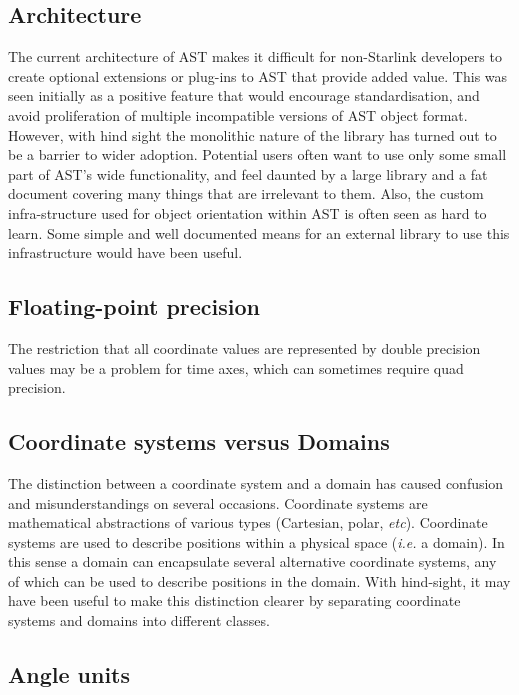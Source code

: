 \documentclass[final,authoryear,5p,times,twocolumn]{elsarticle}
\begin{document}
\subsection{Architecture}

The current architecture of AST makes it difficult for non-Starlink
developers to create optional extensions or plug-ins to AST that provide added
value. This was seen initially as a positive feature that would
encourage standardisation, and avoid proliferation of multiple incompatible
versions of AST object format. However, with hind sight the monolithic
nature of the library has turned out to be a barrier to wider adoption.
Potential users often want to use only some small part of AST's wide
functionality, and feel daunted by a large library and a fat document
covering many things that are irrelevant to them. Also, the custom infra-structure
used for object orientation within AST is often seen as hard to learn.
Some simple and well documented means for an external library to use this
infrastructure would have been useful.

\subsection{Floating-point precision}

The restriction that all coordinate values are represented by
double precision values may be a problem for time axes, which can
sometimes require quad precision.

\subsection{Coordinate systems versus Domains}

The distinction between a coordinate system and a domain has caused
confusion and misunderstandings on several occasions. Coordinate systems are
mathematical abstractions of various types (Cartesian, polar, \emph{etc}).
Coordinate systems are used to describe positions within a physical space
(\emph{i.e.} a domain). In this sense a domain can encapsulate several
alternative coordinate systems, any of which can be used to describe positions
in the domain. With hind-sight, it may have been useful to make this
distinction clearer by separating coordinate systems and domains into
different classes.

\subsection{Angle units}
\end{document}
